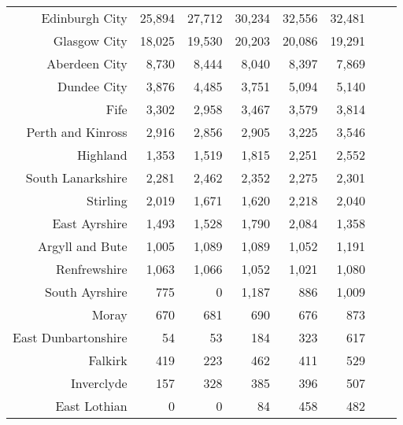 \documentclass[
  12pt,
]{article}
\begin{document}
\begin{longtable}[t]{rrrrrrrr}
\endfoot
\bottomrule
\endlastfoot
Edinburgh City & 25,894 & 27,712 & 30,234 & 32,556 & 32,481 & \cellcolor{white}{ -0.2\%} & \cellcolor{white}{  5.8\%}\\
Glasgow City & 18,025 & 19,530 & 20,203 & 20,086 & 19,291 & \cellcolor{white}{ -4.0\%} & \cellcolor{white}{  1.7\%}\\
Aberdeen City & 8,730 & 8,444 & 8,040 & 8,397 & 7,869 & \cellcolor{white}{ -6.3\%} & \cellcolor{white}{ -2.6\%}\\
Dundee City & 3,876 & 4,485 & 3,751 & 5,094 & 5,140 & \cellcolor{white}{  0.9\%} & \cellcolor{white}{  7.3\%}\\
Fife & 3,302 & 2,958 & 3,467 & 3,579 & 3,814 & \cellcolor{white}{  6.6\%} & \cellcolor{white}{  3.7\%}\\
Perth and Kinross & 2,916 & 2,856 & 2,905 & 3,225 & 3,546 & \cellcolor{white}{ 10.0\%} & \cellcolor{white}{  5.0\%}\\
Highland & 1,353 & 1,519 & 1,815 & 2,251 & 2,552 & \cellcolor{white}{ 13.4\%} & \cellcolor{white}{ 17.2\%}\\
South Lanarkshire & 2,281 & 2,462 & 2,352 & 2,275 & 2,301 & \cellcolor{white}{  1.1\%} & \cellcolor{white}{  0.2\%}\\
Stirling & 2,019 & 1,671 & 1,620 & 2,218 & 2,040 & \cellcolor{white}{ -8.0\%} & \cellcolor{white}{  0.3\%}\\
East Ayrshire & 1,493 & 1,528 & 1,790 & 2,084 & 1,358 & \cellcolor{white}{-34.8\%} & \cellcolor{white}{ -2.3\%}\\
Argyll and Bute & 1,005 & 1,089 & 1,089 & 1,052 & 1,191 & \cellcolor{white}{ 13.2\%} & \cellcolor{white}{  4.3\%}\\
Renfrewshire & 1,063 & 1,066 & 1,052 & 1,021 & 1,080 & \cellcolor{white}{  5.8\%} & \cellcolor{white}{  0.4\%}\\
South Ayrshire & 775 & 0 & 1,187 & 886 & 1,009 & \cellcolor{white}{ 13.9\%} & \cellcolor{white}{  6.8\%}\\
Moray & 670 & 681 & 690 & 676 & 873 & \cellcolor{white}{ 29.1\%} & \cellcolor{white}{  6.8\%}\\
East Dunbartonshire & 54 & 53 & 184 & 323 & 617 & \cellcolor{white}{ 91.0\%} & \cellcolor{white}{ 83.9\%}\\
Falkirk & 419 & 223 & 462 & 411 & 529 & \cellcolor{white}{ 28.7\%} & \cellcolor{white}{  6.0\%}\\
Inverclyde & 157 & 328 & 385 & 396 & 507 & \cellcolor{white}{ 28.0\%} & \cellcolor{white}{ 34.1\%}\\
East Lothian & 0 & 0 & 84 & 458 & 482 & \cellcolor{white}{  5.2\%} & \cellcolor{white}{}\\

\end{longtable}
\end{document}
